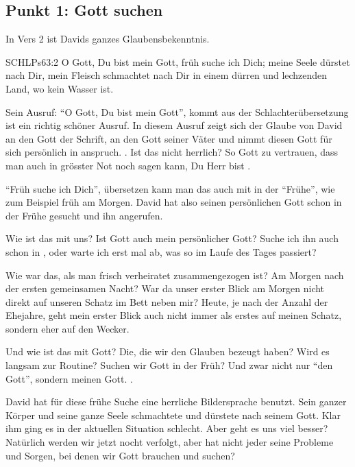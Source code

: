 \documentclass[14pt]{../../inc/mybib}
\begin{document}
    \subsection*{Punkt 1: Gott suchen}
    \begin{block}
    In Vers 2 ist Davids ganzes Glaubensbekenntnis. 
    \begin{bibelbox}{SCHL}{Ps}{63:2}
        O Gott, Du bist mein Gott, früh suche ich Dich; meine Seele dürstet nach Dir, mein Fleisch schmachtet nach Dir in einem dürren und lechzenden Land, wo kein Wasser ist.
    \end{bibelbox}
    Sein Ausruf: \enquote{O Gott, Du bist mein Gott}, kommt aus der Schlachterübersetzung ist ein richtig schöner Ausruf.   In diesem Ausruf zeigt sich der Glaube von David an den Gott der Schrift, an den Gott seiner Väter und nimmt diesen Gott für sich persönlich in anspruch. . Ist das nicht herrlich? So  Gott zu vertrauen, dass man auch in grösster Not noch sagen kann, Du Herr bist . 

    \enquote{Früh suche ich Dich}, übersetzen kann man das auch mit in der \enquote{Frühe},  wie zum Beispiel früh am Morgen. David hat also seinen persönlichen Gott schon in der Frühe gesucht und ihn angerufen.
    \end{block}

    \begin{block}
        Wie ist das mit uns? Ist Gott auch mein persönlicher Gott? Suche ich ihn auch schon in , oder warte ich erst mal ab, was so im Laufe des Tages passiert?

        Wie war das, als man frisch verheiratet zusammengezogen ist? Am Morgen nach der ersten gemeinsamen Nacht? War da unser erster Blick am Morgen nicht direkt auf unseren Schatz im Bett neben mir? Heute, je nach der Anzahl der Ehejahre, geht mein erster Blick auch nicht immer als erstes auf meinen Schatz, sondern eher auf den Wecker.

        Und wie ist das mit  Gott? Die, die wir den Glauben bezeugt haben? Wird es langsam zur Routine? Suchen wir Gott in der Früh? Und zwar nicht nur \enquote{den Gott}, sondern meinen Gott. .

        David hat für diese frühe Suche eine herrliche Bildersprache benutzt.  Sein ganzer Körper und seine ganze Seele schmachtete und dürstete nach seinem Gott. Klar ihm ging es in der aktuellen Situation schlecht. Aber geht es uns viel besser? Natürlich werden wir jetzt nocht verfolgt, aber hat nicht jeder seine Probleme und Sorgen, bei denen wir Gott brauchen und suchen?
    \end{block}
\end{document}
